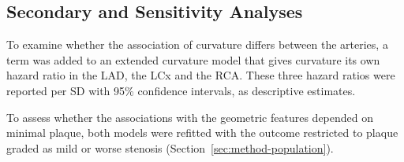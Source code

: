 \subsection{Secondary and Sensitivity Analyses}
\label{sec:method-sensitivity}

To examine whether the association of curvature differs between the arteries, a term was added to an extended curvature model that gives curvature its own hazard ratio in the LAD, the LCx and the RCA.
These three hazard ratios were reported per SD with 95\% confidence intervals, as descriptive estimates.

To assess whether the associations with the geometric features depended on minimal plaque, both models were refitted with the outcome restricted to plaque graded as mild or worse stenosis (Section~\ref{sec:method-population}).
